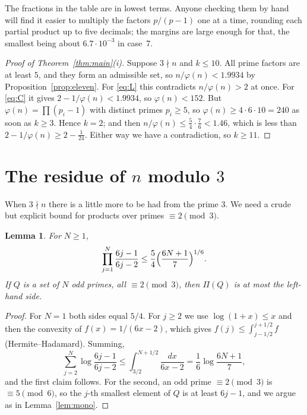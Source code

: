 \documentclass[11pt]{amsart}
\newtheorem{lemma}[theorem]{Lemma}
\theoremstyle{definition}
\theoremstyle{remark}
\begin{document}
The fractions in the table are in lowest terms. Anyone checking them by
hand will find it easier to multiply the factors $p/(p-1)$ one at a
time, rounding each partial product up to five decimals; the margins
are large enough for that, the smallest being about $6.7\cdot10^{-3}$ in
case~7.

\begin{proof}[Proof of Theorem~\ref{thm:main}(i)]
Suppose $3\nmid n$ and $k\le10$. All prime factors are at least $5$, and
they form an admissible set, so $n/\varphi(n)<1.9934$ by
Proposition~\ref{prop:eleven}. For \eqref{eq:L} this contradicts
$n/\varphi(n)>2$ at once. For \eqref{eq:C} it gives
$2-1/\varphi(n)<1.9934$, so $\varphi(n)<152$. But $\varphi(n)=\prod(p_i-1)$ with distinct primes
$p_i\ge5$, so $\varphi(n)\ge4\cdot6\cdot10=240$ as soon as $k\ge3$.
Hence $k=2$; and then $n/\varphi(n)\le\frac54\cdot\frac76<1.46$,
which is less than $2-1/\varphi(n)\ge2-\frac1{24}$. Either way we have a
contradiction, so $k\ge11$.
\end{proof}

\section{The residue of \texorpdfstring{$n$}{n} modulo \texorpdfstring{$3$}{3}}

When $3\nmid n$ there is a little more to be had from the prime $3$. We
need a crude but explicit bound for products over primes $\equiv2\pmod
3$.

\begin{lemma}\label{lem:sum}
For $N\ge1$,
\[
  \prod_{j=1}^{N}\frac{6j-1}{6j-2}\le\frac54\Bigl(\frac{6N+1}{7}\Bigr)^{1/6}.
\]
If $Q$ is a set of $N$ odd primes, all $\equiv2\pmod3$, then $\Pi(Q)$ is
at most the left-hand side.
\end{lemma}

\begin{proof}
For $N=1$ both sides equal $5/4$. For $j\ge2$ we use
$\log(1+x)\le x$ and then the convexity of $f(x)=1/(6x-2)$, which gives
$f(j)\le\int_{j-1/2}^{j+1/2}f$ (Hermite--Hadamard). Summing,
\[
  \sum_{j=2}^{N}\log\frac{6j-1}{6j-2}\le\int_{3/2}^{N+1/2}\frac{dx}{6x-2}
  =\frac16\log\frac{6N+1}{7},
\]
and the first claim follows. For the second, an odd prime
$\equiv2\pmod3$ is $\equiv5\pmod6$, so the $j$-th smallest element of $Q$
is at least $6j-1$, and we argue as in Lemma~\ref{lem:mono}.
\end{proof}
\end{document}
